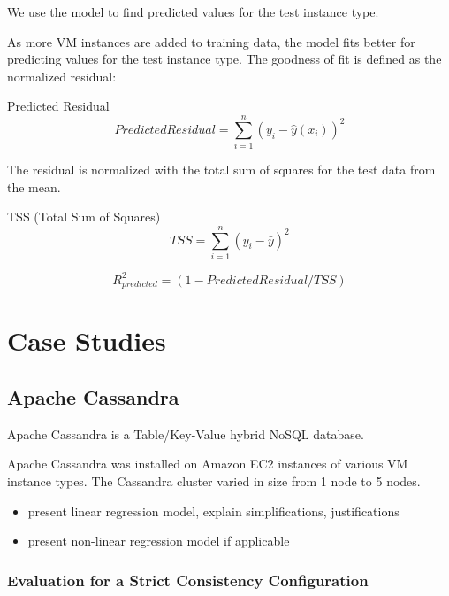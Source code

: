 \documentclass{acm_proc_article-sp}
\begin{document}
We use the model to find predicted values for the test instance type.

As more VM instances are added to training data, the model fits better for predicting values for the test instance type.  The goodness of fit is defined as the normalized residual:

\begin{definition}
Predicted Residual
\begin{displaymath}{
Predicted Residual=\sum_{i=1}^{n} (y_i - \hat{y}(x_i))^{2}
}\end{displaymath}

\end{definition}

The residual is normalized with the total sum of squares for the test data from the mean.

\begin{definition}
TSS (Total Sum of Squares)
\begin{displaymath}{
TSS=\sum_{i=1}^{n} (y_i - \bar{y})^{2}
}\end{displaymath}

\begin{displaymath}{
R_{predicted}^2 = (1 - PredictedResidual/TSS)
}\end{displaymath}
\end{definition}

 \section{Case Studies}

\subsection{Apache Cassandra}

Apache Cassandra is a Table/Key-Value hybrid NoSQL database.

Apache Cassandra was installed on Amazon EC2 instances of various VM instance types. The Cassandra cluster varied in size from 1 node to 5 nodes.

\begin{itemize}
   \item present linear regression model, explain simplifications, justifications
   \item present non-linear regression model if applicable
\end{itemize}

\subsubsection{Evaluation for a Strict Consistency Configuration}
\end{document}
